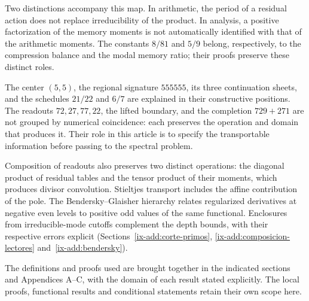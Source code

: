 Two distinctions accompany this map. In arithmetic, the period of a residual action does not replace irreducibility of the product. In analysis, a positive factorization of the memory moments is not automatically identified with that of the arithmetic moments. The constants \(8/81\) and \(5/9\) belong, respectively, to the compression balance and the modal memory ratio; their proofs preserve these distinct roles.

The center \((5,5)\), the regional signature \(555555\), its three continuation sheets, and the schedules \(21/22\) and \(6/7\) are explained in their constructive positions. The readouts \(72,27,77,22\), the lifted boundary, and the completion \(729+271\) are not grouped by numerical coincidence: each preserves the operation and domain that produces it. Their role in this article is to specify the transportable information before passing to the spectral problem.

Composition of readouts also preserves two distinct operations: the
diagonal product of residual tables and the tensor product of their
moments, which produces divisor convolution. Stieltjes transport includes
the affine contribution of the pole. The Bendersky--Glaisher hierarchy
relates regularized derivatives at negative even levels to positive odd
values of the same functional. Enclosures from irreducible-mode cutoffs
complement the depth bounds, with their respective errors explicit
(Sections~\ref{ix-add:corte-primos},
\ref{ix-add:composicion-lectores} and~\ref{ix-add:bendersky}).

The definitions and proofs used are brought together in the indicated sections and Appendices A--C, with the domain of each result stated explicitly. The local proofs, functional results and conditional statements retain their own scope here.
